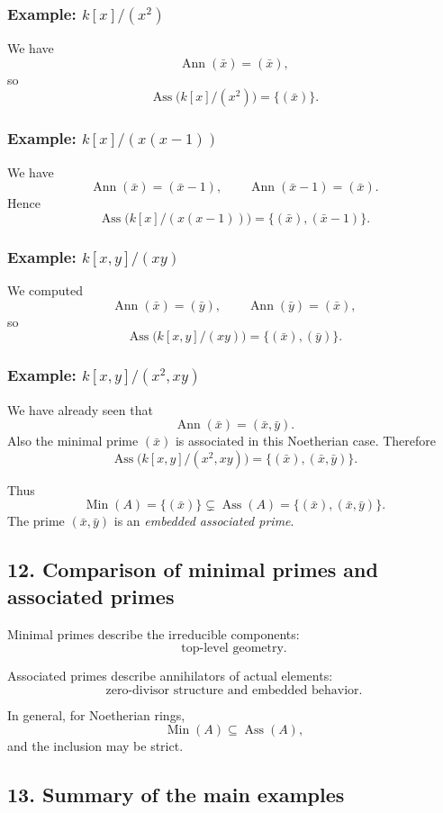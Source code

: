 \documentclass[12pt,a4paper,oneside]{report}
\DeclareMathOperator{\Ass}{Ass}
\DeclareMathOperator{\Ann}{Ann}
\DeclareMathOperator{\Min}{Min}
\theoremstyle{notespace}
\begin{document}
	\subsubsection{Example: \(k[x]/(x^2)\)}
	We have
	\[
	\Ann(\bar x)=(\bar x),
	\]
	so
	\[
	\Ass\bigl(k[x]/(x^2)\bigr)=\{(\bar x)\}.
	\]
	
	\subsubsection{Example: \(k[x]/(x(x-1))\)}
	We have
	\[
	\Ann(\bar x)=(\bar x-1),
	\qquad
	\Ann(\bar x-1)=(\bar x).
	\]
	Hence
	\[
	\Ass\bigl(k[x]/(x(x-1))\bigr)=\{(\bar x),(\bar x-1)\}.
	\]
	
	\subsubsection{Example: \(k[x,y]/(xy)\)}
	We computed
	\[
	\Ann(\bar x)=(\bar y),
	\qquad
	\Ann(\bar y)=(\bar x),
	\]
	so
	\[
	\Ass\bigl(k[x,y]/(xy)\bigr)=\{(\bar x),(\bar y)\}.
	\]
	
	\subsubsection{Example: \(k[x,y]/(x^2,xy)\)}
	We have already seen that
	\[
	\Ann(\bar x)=(\bar x,\bar y).
	\]
	Also the minimal prime \((\bar x)\) is associated in this Noetherian case. Therefore
	\[
	\Ass\bigl(k[x,y]/(x^2,xy)\bigr)=\{(\bar x),(\bar x,\bar y)\}.
	\]
	
	Thus
	\[
	\Min(A)=\{(\bar x)\}
	\subsetneq
	\Ass(A)=\{(\bar x),(\bar x,\bar y)\}.
	\]
	The prime \((\bar x,\bar y)\) is an \emph{embedded associated prime}.
	
	\subsection{12. Comparison of minimal primes and associated primes}
	
	Minimal primes describe the irreducible components:
	\[
	\text{top-level geometry.}
	\]
	
	Associated primes describe annihilators of actual elements:
	\[
	\text{zero-divisor structure and embedded behavior.}
	\]
	
	In general, for Noetherian rings,
	\[
	\Min(A)\subseteq \Ass(A),
	\]
	and the inclusion may be strict.
	
	\subsection{13. Summary of the main examples}
	
\end{document}
